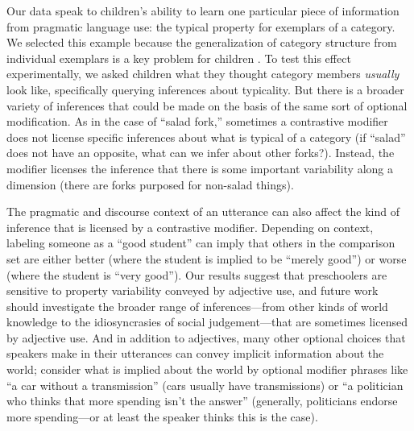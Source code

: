 \documentclass[man]{apa2}
\begin{document}

Our data speak to children's ability to learn one particular piece of information from pragmatic language use: the typical property for exemplars of a category. We selected this example because the generalization of category structure from individual exemplars is a key problem for children \cite{markman1991}. To test this effect experimentally, we asked children what they thought category members \emph{usually} look like, specifically querying inferences about typicality. But there is a broader variety of inferences that could be made on the basis of the same sort of optional modification. As in the case of ``salad fork,'' sometimes a contrastive modifier does not license specific inferences about what is typical of a category (if ``salad'' does not have an opposite, what can we infer about other forks?). Instead, the modifier licenses the inference that there is some important variability along a dimension (there are forks purposed for non-salad things). 

The pragmatic and discourse context of an utterance can also affect the kind of inference that is licensed by a contrastive modifier. Depending on context, labeling someone as a ``good student'' can imply that others in the comparison set are either better (where the student is implied to be ``merely good'') or worse (where the student is ``very good''). Our results suggest that preschoolers are sensitive to property variability conveyed by adjective use, and future work should investigate the broader range of inferences---from other kinds of world knowledge to the idiosyncrasies of social judgement---that are sometimes licensed by adjective use. And in addition to adjectives, many other optional choices that speakers make in their utterances can convey implicit information about the world; consider what is implied about the world by optional modifier phrases like ``a car without a transmission'' (cars usually have transmissions) or ``a politician who thinks that more spending isn't the answer'' (generally, politicians endorse more spending---or at least the speaker thinks this is the case). 

\end{document}
